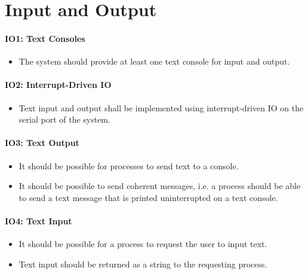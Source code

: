 \section{Input and Output}
\label{se:input_output}

\paragraph*{IO1: Text Consoles}
\label{pg:io1}

\begin{itemize}
  \item The system should provide at least one text console for input and output.
\end{itemize}

\paragraph*{IO2: Interrupt-Driven IO}
\label{pg:io2}

\begin{itemize}
  \item Text input and output shall be implemented using interrupt-driven IO on the serial port of the system.
\end{itemize}

\paragraph*{IO3: Text Output}
\label{pg:io3}

\begin{itemize}
  \item It should be possible for processes to send text to a console.
  \item  It should be possible to send coherent messages, i.e. a process should be able to send a text message that is printed uninterrupted on a text console.
\end{itemize}

\paragraph*{IO4: Text Input}
\label{pg:io4}

\begin{itemize}
  \item It should be possible for a process to request the user to input text.
  \item  Text input should be returned as a string to the requesting process.
\end{itemize}

